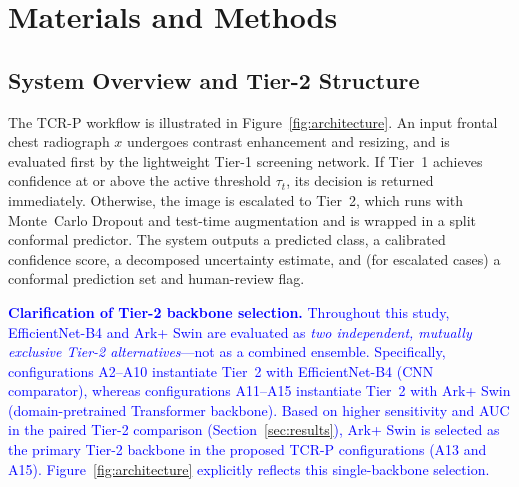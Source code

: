 \documentclass[diagnostics,article,submit,moreauthors]{Definitions/mdpi}
\newcommand{\rev}[1]{\textcolor{blue}{#1}}
\begin{document}
\section{Materials and Methods}
\label{sec:methods}

\subsection{System Overview and Tier-2 Structure}

The TCR-P workflow is illustrated in Figure~\ref{fig:architecture}. An input frontal chest radiograph $x$ undergoes contrast enhancement and resizing, and is evaluated first by the lightweight Tier-1 screening network. If Tier~1 achieves confidence at or above the active threshold $\tau_t$, its decision is returned immediately. Otherwise, the image is escalated to Tier~2, which runs with Monte~Carlo Dropout and test-time augmentation and is wrapped in a split conformal predictor. The system outputs a predicted class, a calibrated confidence score, a decomposed uncertainty estimate, and (for escalated cases) a conformal prediction set and human-review flag.

\rev{\textbf{Clarification of Tier-2 backbone selection.} Throughout this study, EfficientNet-B4 and Ark+ Swin are evaluated as \emph{two independent, mutually exclusive Tier-2 alternatives}---not as a combined ensemble. Specifically, configurations A2--A10 instantiate Tier~2 with EfficientNet-B4 (CNN comparator), whereas configurations A11--A15 instantiate Tier~2 with Ark+ Swin (domain-pretrained Transformer backbone). Based on higher sensitivity and AUC in the paired Tier-2 comparison (Section~\ref{sec:results}), Ark+ Swin is selected as the primary Tier-2 backbone in the proposed TCR-P configurations (A13 and A15). Figure~\ref{fig:architecture} explicitly reflects this single-backbone selection.}
\end{document}
